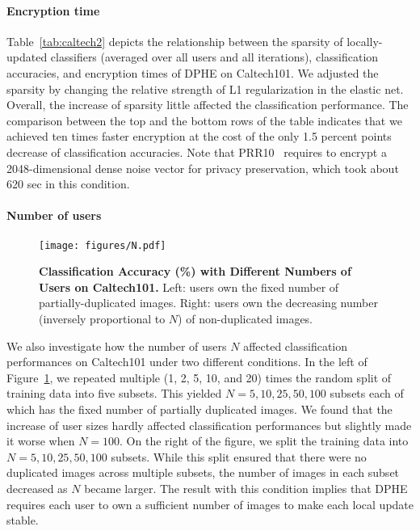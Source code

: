 \documentclass[10pt,twocolumn,letterpaper]{article}
\begin{document}
\paragraph{Encryption time}
\begin{table}[t]
\caption{{\bf Sparsity (\%), Classification Accuracy (\%), and Encryption Time (sec) of DPHE on Caltech101.}}
\centering
{}
\label{tab:caltech2}
\end{table}
Table~\ref{tab:caltech2} depicts the relationship between the sparsity of locally-updated classifiers (averaged over all users and all iterations), classification accuracies, and encryption times of DPHE on Caltech101. We adjusted the sparsity by changing the relative strength of L1 regularization in the elastic net. Overall, the increase of sparsity little affected the classification performance. The comparison between the top and the bottom rows of the table indicates that we achieved ten times faster encryption at the cost of the only 1.5 percent points decrease of classification accuracies. Note that PRR10~\cite{Pathak2010a} requires to encrypt a 2048-dimensional dense noise vector for privacy preservation, which took about 620 sec in this condition.

\paragraph{Number of users}
\begin{figure}[t]
\centering
\texttt{[image: figures/N.pdf]}
\caption{{\bf Classification Accuracy (\%) with Different Numbers of Users on Caltech101.} Left: users own the fixed number of partially-duplicated images. Right: users own the decreasing number (inversely proportional to $N$) of non-duplicated images.}
\label{fig:N}
\end{figure}
We also investigate how the number of users $N$ affected classification performances on Caltech101 under two different conditions. In the left of Figure~\ref{fig:N}, we repeated multiple (1, 2, 5, 10, and 20) times the random split of training data into five subsets. This yielded $N=5, 10, 25, 50, 100$ subsets each of which has the fixed number of partially duplicated images. We found that the increase of user sizes hardly affected classification performances but slightly made it worse when $N=100$. On the right of the figure, we split the training data into $N=5, 10, 25, 50, 100$ subsets. While this split ensured that there were no duplicated images across multiple subsets, the number of images in each subset decreased as $N$ became larger. The result with this condition implies that DPHE requires each user to own a sufficient number of images to make each local update stable.
\end{document}
